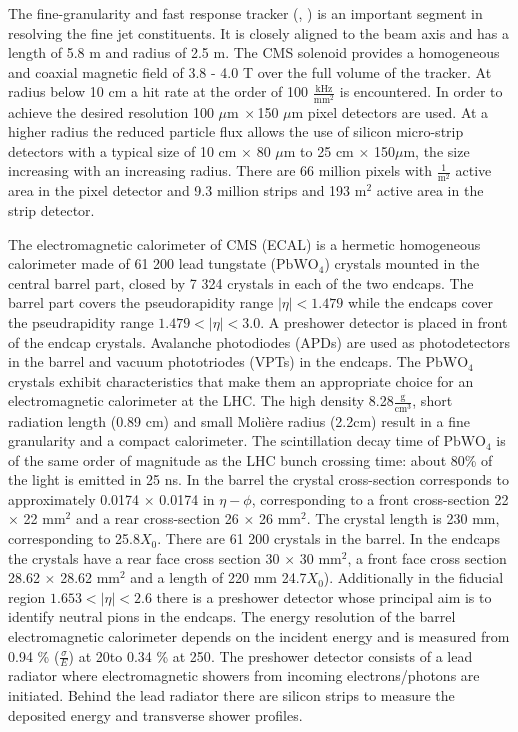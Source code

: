 The fine-granularity and fast response tracker (\cite{Karimaki:368412}, \cite{tracker_addendum}) is an important segment in resolving the fine jet constituents. It is closely aligned to the beam axis and has a length of 5.8 m and radius of 2.5 m. The CMS solenoid provides a homogeneous and coaxial magnetic field of 3.8 - 4.0 T over the full volume of the tracker. At radius below 10 cm a hit rate at the order of 100 $\frac{\text{kHz}}{\text{mm}^2}$ is encountered. In order to achieve the desired resolution 100 $\mu\text{m}\ \times$150 $\mu\text{m}$ pixel detectors are used. At a higher radius the reduced particle flux allows the use of silicon micro-strip detectors with a typical size of 10 cm $\times$ 80 $\mu$m to 25 cm $\times$ 150$\mu$m, the size increasing with an increasing radius. There are 66 million pixels with $\frac{1}{\text{m}^2}$ active area in the pixel detector and 9.3 million strips and 193 m${}^2$ active area in the strip detector.

The electromagnetic calorimeter of CMS (ECAL) is a hermetic homogeneous calorimeter made of 61 200 lead tungstate ($\text{PbWO}_{4}$) crystals mounted in the central barrel part, closed by 7 324 crystals in each of the two endcaps. The barrel part covers the pseudorapidity range $\left|\eta\right|<1.479$ while the endcaps cover the pseudrapidity range $1.479<\left|\eta\right|<3.0$. A preshower detector is placed in front of the endcap crystals. Avalanche photodiodes (APDs) are used as photodetectors in the barrel and vacuum phototriodes (VPTs) in the endcaps. The $\text{PbWO}_{4}$ crystals exhibit characteristics that make them an appropriate choice for an electromagnetic calorimeter at the LHC. The high density 8.28$\frac{\text{g}}{\text{cm}^3}$, short radiation length (0.89 cm)  and small Molière radius (2.2cm) result in a fine granularity and a compact calorimeter. The scintillation decay time of $\text{PbWO}_{4}$ is of the same order of magnitude as the LHC bunch crossing time:
about 80\% of the light is emitted in 25 ns. In the barrel the crystal cross-section corresponds to approximately 0.0174 $\times$ 0.0174 in $\eta - \phi$, corresponding to a front cross-section 22 $\times$ 22 $\text{mm}^2$ and a rear cross-section 26 $\times$ 26 $\text{mm}^2$. The crystal length is 230 mm, corresponding to 25.8$X_{0}$. There are 61 200 crystals in the barrel. In the endcaps the crystals have a rear face cross section 30 $\times$ 30 $\text{mm}^2$, a front face cross section 28.62 $\times$ 28.62 $\text{mm}^2$ and a length of 220 mm 24.7$X_{0}$). Additionally in the fiducial region $1.653 < \left|\eta\right| <2.6$ there is a preshower detector whose principal aim is to identify neutral pions in the endcaps. The energy resolution of the barrel electromagnetic calorimeter depends on the incident energy and is measured from 0.94 \% ($\frac{\sigma}{E}$) at 20\GeV to 0.34 \% at 250\GeV \cite{Adzic:2007mi}. The preshower detector consists of a lead radiator where electromagnetic showers from incoming electrons/photons are initiated. Behind the lead radiator there are silicon strips to measure the deposited energy and transverse shower profiles.

